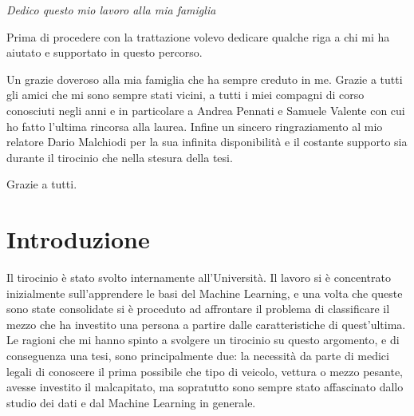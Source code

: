 \documentclass[12pt,italian]{report}
\begin{document}
\frontespizio
\beforepreface

% 
%

{\raggedleft \large \sl Dedico questo mio lavoro alla mia famiglia\\
	
	}



         
% 
%


%
%

Prima di procedere con la trattazione volevo dedicare qualche riga a chi mi ha aiutato e supportato in questo percorso.

Un grazie doveroso alla mia famiglia che ha sempre creduto in me. Grazie a tutti gli amici che mi sono sempre stati vicini, a tutti i miei compagni di corso conosciuti negli anni e in particolare a Andrea Pennati e Samuele Valente con cui ho fatto l'ultima rincorsa alla laurea. 
Infine un sincero ringraziamento al mio relatore Dario Malchiodi per la sua infinita disponibilità e il costante supporto sia durante il tirocinio che nella stesura della tesi.

Grazie a tutti.

%
%

\afterpreface

% 
% 

\chapter*{Introduzione}
\label{cap:introduzione}
Il tirocinio è stato svolto internamente all'Università. Il lavoro si è concentrato inizialmente sull'apprendere le basi del Machine Learning, e una volta che queste sono state consolidate si è proceduto ad affrontare il problema di classificare il mezzo che ha investito una persona a partire dalle caratteristiche di quest'ultima. Le ragioni che mi hanno spinto a svolgere un tirocinio su questo argomento, e di conseguenza una tesi, sono principalmente due: la necessità da parte di medici legali di conoscere il prima possibile che tipo di veicolo, vettura o mezzo pesante, avesse investito il malcapitato, ma sopratutto sono sempre stato affascinato dallo studio dei dati e dal Machine Learning in generale.
\end{document}
